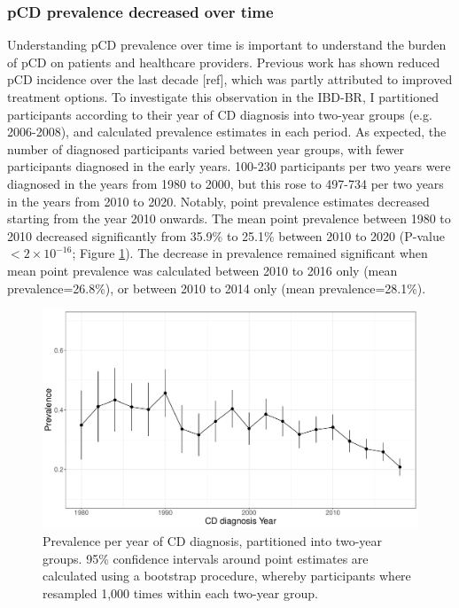     \subsubsection{pCD prevalence decreased over time}
    Understanding pCD prevalence over time is important to understand the burden of pCD on patients and healthcare providers. Previous work has shown reduced pCD incidence over the last decade [ref], which was partly attributed to improved treatment options. To investigate this observation in the IBD-BR, I partitioned participants according to their year of CD diagnosis into two-year groups (e.g. 2006-2008), and calculated prevalence estimates in each period. As expected, the number of diagnosed participants varied between year groups, with fewer participants diagnosed in the early years. 100-230 participants per two years were diagnosed in the years from 1980 to 2000, but this rose to 497-734 per two years in the years from 2010 to 2020. Notably, point prevalence estimates decreased starting from the year 2010 onwards. The mean point prevalence between 1980 to 2010 decreased significantly from 35.9\% to 25.1\% between 2010 to 2020 (P-value $<2\times10^{-16}$; Figure \ref{fig:pcd_prev}). The decrease in prevalence remained significant when mean point prevalence was calculated between 2010 to 2016 only (mean prevalence=26.8\%), or between 2010 to 2014 only (mean prevalence=28.1\%).\\
    \begin{figure}[htb] 
      \centering    
      \includegraphics[width=1.0\textwidth]{fig2}
      \caption[Figure]{Prevalence per year of CD diagnosis, partitioned into two-year groups. 95\% confidence intervals around point estimates are calculated using a bootstrap procedure, whereby participants where resampled 1,000 times within each two-year group.}
      \label{fig:pcd_prev}
      \end{figure}
 
